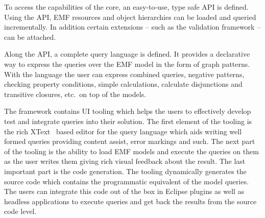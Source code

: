 To access the capabilities of the core, an easy-to-use, type safe API is
defined. Using the API, EMF resources and object hierarchies can be loaded and
queried incrementally. In addition certain extensions -- such as the validation
framework -- can be attached.

Along the API, a complete query language is defined. It provides a declarative
way to express the queries over the EMF model in the form of graph patterns.
With the language the user can express combined queries, negative patterns,
checking property conditions, simple calculations, calculate disjunctions and
transitive closures, etc.~on top of the models.

The framework contains UI tooling which helps the users to effectively develop
test and integrate queries into their solution. The first element of the tooling
is the rich XText~\cite{XtextWeb} based editor for the query language which aids writing well
formed queries providing content assist, error markings and such. The next part
of the tooling is the ability to load EMF models and execute the queries on them
as the user writes them giving rich visual feedback about the result.
The last important part is the code generation. The tooling dynamically
generates the source code which contains the programmatic equivalent of the
model queries. The users can integrate this code out of the box in Eclipse
plugins as well as headless applications to execute queries and get back the
results from the source code level.



